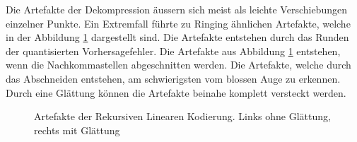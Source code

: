 Die Artefakte der Dekompression äussern sich meist als leichte Verschiebungen einzelner Punkte. Ein Extremfall führte zu Ringing ähnlichen Artefakte, welche in der Abbildung \ref{resultate:loesung2:adaptive:median:artefakte} dargestellt sind. Die Artefakte entstehen durch das Runden der quantisierten Vorhersagefehler. Die Artefakte aus Abbildung \ref{resultate:loesung2:adaptive:median:artefakte} entstehen, wenn die Nachkommastellen abgeschnitten werden. Die Artefakte, welche durch das Abschneiden entstehen, am schwierigsten vom blossen Auge zu erkennen. Durch eine Glättung können die Artefakte beinahe komplett versteckt werden.
\begin{figure}[!htbp]
	\center
	\caption{Artefakte der Rekursiven Linearen Kodierung. Links ohne Glättung, rechts mit Glättung}
	\label{resultate:loesung2:adaptive:median:artefakte}
\end{figure}

